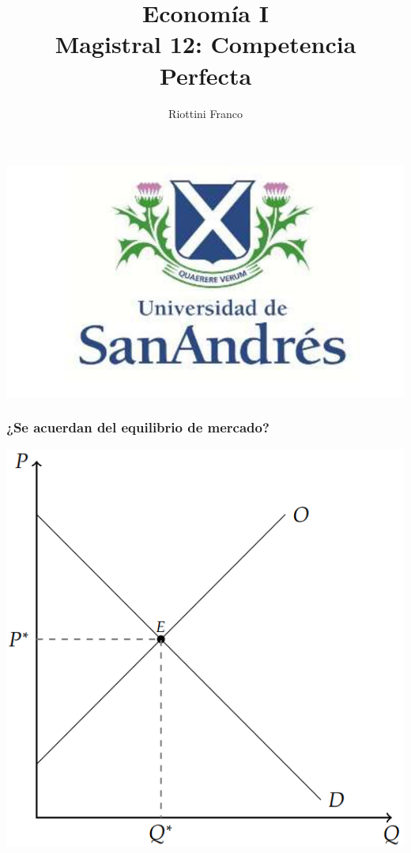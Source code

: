 \documentclass{beamer}
\title[Economía I]{Economía I \vspace{4mm}
\\ Magistral 12: Competencia Perfecta}
\date{}
\author[Riottini]{Riottini Franco}
\institute[]{Universidad de San Andrés}
\begin{document}
\begin{frame}
\titlepage
\centering
\includegraphics[scale=0.2]{../Figures/logoUDESA.jpg} 
\end{frame}


\begin{frame}
\frametitle{¿Se acuerdan del equilibrio de mercado?}
\centering
\includegraphics[scale=0.6]{../Figures/C21.1.png}
\end{frame}
\end{document}
